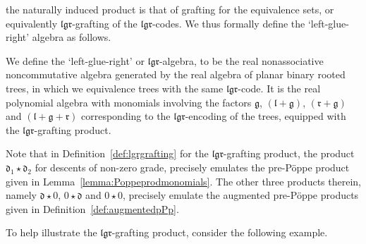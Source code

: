 \documentclass[5p,twocolumn]{elsarticle}
\newcommand*{\el}{\mathfrak l}
\newcommand*{\gl}{\mathfrak g}
\newcommand*{\rl}{\mathfrak r}
\newcommand*{\df}{\mathfrak d}
\begin{document}
the naturally induced product is that of grafting for the equivalence sets, or equivalently $\el\gl\rl$-grafting of the $\el\gl\rl$-codes.
We thus formally define the `left-glue-right' algebra as follows.
%
\begin{definition}\label{def:lgr-alg}
  We define the `left-glue-right' or $\el\gl\rl$-algebra, to be the real nonassociative noncommutative algebra generated by the real algebra of planar binary rooted trees,
  in which we equivalence trees with the same $\el\gl\rl$-code. It is the real polynomial algebra with monomials involving the factors $\gl$, $(\el+\gl)$, $(\rl+\gl)$ and $(\el+\gl+\rl)$
  corresponding to the $\el\gl\rl$-encoding of the trees, equipped with the $\el\gl\rl$-grafting product.
\end{definition}
%
\begin{remark}
  Note that in Definition~\ref{def:lgrgrafting} for the $\el\gl\rl$-grafting product, the product $\df_1\star\df_2$ for descents of non-zero grade,
  precisely emulates the pre-P\"oppe product given in Lemma~\ref{lemma:Poppeprodmonomials}.
  The other three products therein, namely $\df\star\mathfrak{0}$, $\mathfrak{0}\star\df$ and $\mathfrak{0}\star\mathfrak{0}$, precisely emulate the augmented pre-P\"oppe products
  given in Definition~\ref{def:augmentedpPp}.
\end{remark}
%
To help illustrate the $\el\gl\rl$-grafting product, consider the following example.
%
\end{document}
